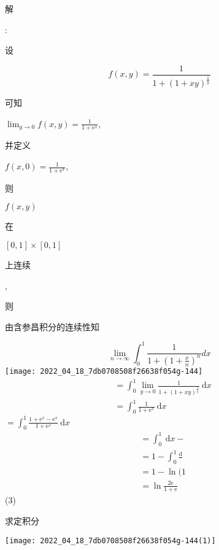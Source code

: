 \documentclass[10pt]{article}
\begin{document}
\begin{CJK}{UTF8}{mj}解\end{CJK}: \begin{CJK}{UTF8}{mj}设\end{CJK}
$$
f(x, y)=\frac{1}{1+(1+x y)^{\frac{1}{y}}}
$$
\begin{CJK}{UTF8}{mj}可知\end{CJK} $\lim _{y \rightarrow 0} f(x, y)=\frac{1}{1+\mathrm{e}^{x}}$, \begin{CJK}{UTF8}{mj}并定义\end{CJK} $f(x, 0)=\frac{1}{1+\mathrm{e}^{x}}$, \begin{CJK}{UTF8}{mj}则\end{CJK} $f(x, y)$ \begin{CJK}{UTF8}{mj}在\end{CJK} $[0,1] \times[0,1]$ \begin{CJK}{UTF8}{mj}上连续\end{CJK}, \begin{CJK}{UTF8}{mj}则\end{CJK} \begin{CJK}{UTF8}{mj}由含参昌积分的连续性知\end{CJK}
$$
\lim _{n \rightarrow \infty} \int_{0}^{1} \frac{1}{1+\left(1+\frac{x}{n}\right)^{n}} d x
$$
\texttt{[image: 2022\_04\_18\_7db0708508f26638f054g-144]}
$$
\begin{aligned}
& =\int_{0}^{1} \lim _{y \rightarrow 0} \frac{1}{1+(1+x y)^{\frac{1}{y}}} \mathrm{~d} x \\
& =\int_{0}^{1} \frac{1}{1+\mathrm{e}^{x}} \mathrm{~d} x
\end{aligned}
$$
$=\int_{0}^{1} \frac{1+\mathrm{e}^{x}-\mathrm{e}^{x}}{1+\mathrm{e}^{x}} \mathrm{~d} x$
$$
\begin{aligned}
&=\int_{0}^{1} \mathrm{~d} x- \\
&=1-\int_{0}^{1} \frac{\mathrm{d}}{} \\
&=1-\ln (1 \\
&=\ln \frac{2 \mathrm{e}}{1+\mathrm{e}}
\end{aligned}
$$
(3) \begin{CJK}{UTF8}{mj}求定积分\end{CJK}

\texttt{[image: 2022\_04\_18\_7db0708508f26638f054g-144(1)]}
\end{document}

